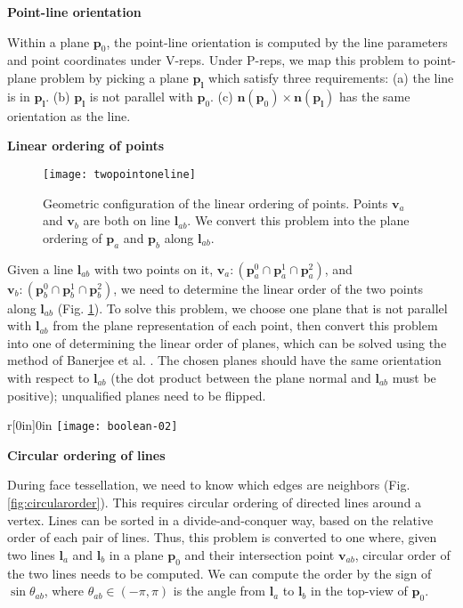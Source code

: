 \vspace{0.5em}
\noindent \textbf{Point-line orientation}

\noindent Within a plane $\bm{p}_0$, the point-line orientation is computed by the line parameters and point coordinates under V-reps. Under P-reps, we map this problem to point-plane problem by picking a plane $\bm{p_l}$ which satisfy three requirements: (a) the line is in $\bm{p_l}$. (b) $\bm{p_l}$ is not parallel with $\bm{p}_0$. (c) $\bm{n}(\bm{p}_0) \times \bm{n}(\bm{p_l})$ has the same orientation as the line.

\vspace{0.5em}
\noindent \textbf{Linear ordering of points}

\begin{figure}
  \centering
  \texttt{[image: twopointoneline]}\\
  \caption{Geometric configuration of the linear ordering of points. Points $\bm{v}_a$ and $\bm{v}_b$ are both on line $\bm{l}_{ab}$. We convert this problem into the plane ordering of $\bm{p}_a$ and $\bm{p}_b$ along $\bm{l}_{ab}$.}\label{fig:twopointoneline}
\end{figure}

\noindent Given a line $\bm{l}_{ab}$ with two points on it, $\bm{v}_a\colon(\bm{p}_a^0\cap\bm{p}_a^1\cap\bm{p}_a^2)$, and $\bm{v}_b\colon(\bm{p}_b^0\cap\bm{p}_b^1\cap\bm{p}_b^2)$, we need to determine the linear order of the two points along $\bm{l}_{ab}$ (Fig. \ref{fig:twopointoneline}).
To solve this problem, we choose one plane that is not parallel with $\bm{l}_{ab}$ from the plane representation of each point, then convert this problem into one of determining the linear order of planes, which can be solved using the method of Banerjee et al. \cite{banerjee1996topologically}. The chosen planes should have the same orientation with respect to $\bm{l}_{ab}$ (the dot product between the plane normal and $\bm{l}_{ab}$ must be positive); unqualified planes need to be flipped.


\begin{wrapfigure}{r}[0in]{0in}
\texttt{[image: boolean-02]}
\end{wrapfigure}
\vspace{0.5em}
\noindent \textbf{Circular ordering of lines}~~~~

\noindent During face tessellation, we need to know which edges are neighbors (Fig. \ref{fig:circularorder}).  This requires circular ordering of directed lines around a vertex. Lines can be sorted in a divide-and-conquer way, based on the relative order of each pair of lines. Thus, this problem is converted to one where, given two lines $\bm{l}_a$ and $\bm{l}_b$ in a plane $\bm{p}_0$ and their intersection point $\bm{v}_{ab}$, circular order of the two lines needs to be computed.
We can compute the order by the sign of $\sin{\theta_{ab}}$, where $\theta_{ab}\in(-\pi,\pi)$ is the angle from $\bm{l}_a$ to $\bm{l}_b$ in the top-view of $\bm{p}_0$.

